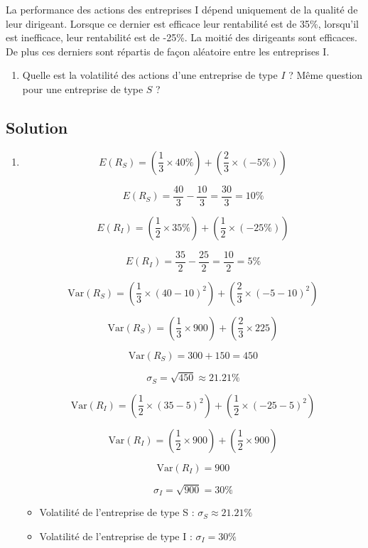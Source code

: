 \documentclass[a4paper, 12pt]{report}
\begin{document}
La performance des actions des entreprises I dépend uniquement de la qualité de leur dirigeant. Lorsque ce dernier est efficace leur rentabilité est de 35\%, lorsqu'il est inefficace, leur rentabilité est de -25\%. La moitié des dirigeants sont efficaces. De plus ces derniers sont répartis de façon aléatoire entre les entreprises I.

\begin{enumerate}
	\item Quelle est la volatilité des actions d'une entreprise de type  \( I \) ? Même question pour une entreprise de type \( S \) ?
\end{enumerate}

\subsection{Solution}

\begin{enumerate}
	\item \[
E(R_S) = \left(\frac{1}{3} \times 40\%\right) + \left(\frac{2}{3} \times (-5\%)\right)
\]

\[
E(R_S) = \frac{40}{3} - \frac{10}{3} = \frac{30}{3} = 10\%
\]



\[
E(R_I) = \left(\frac{1}{2} \times 35\%\right) + \left(\frac{1}{2} \times (-25\%)\right)
\]

\[
E(R_I) = \frac{35}{2} - \frac{25}{2} = \frac{10}{2} = 5\%
\]

\[
\text{Var}(R_S) = \left(\frac{1}{3} \times (40 - 10)^2\right) + \left(\frac{2}{3} \times (-5 - 10)^2\right)
\]

\[
\text{Var}(R_S) = \left(\frac{1}{3} \times 900\right) + \left(\frac{2}{3} \times 225\right)
\]

\[
\text{Var}(R_S) = 300 + 150 = 450
\]

\[
\sigma_S = \sqrt{450} \approx 21.21\%
\]

\[
\text{Var}(R_I) = \left(\frac{1}{2} \times (35 - 5)^2\right) + \left(\frac{1}{2} \times (-25 - 5)^2\right)
\]

\[
\text{Var}(R_I) = \left(\frac{1}{2} \times 900\right) + \left(\frac{1}{2} \times 900\right)
\]

\[
\text{Var}(R_I) = 900
\]

\[
\sigma_I = \sqrt{900} = 30\%
\]

\begin{itemize}
	\item Volatilité de l'entreprise de type S : \( \sigma_S \approx 21.21\% \)
	\item Volatilité de l'entreprise de type I : \( \sigma_I = 30\% \)
\end{itemize}
\end{enumerate}
\end{document}

